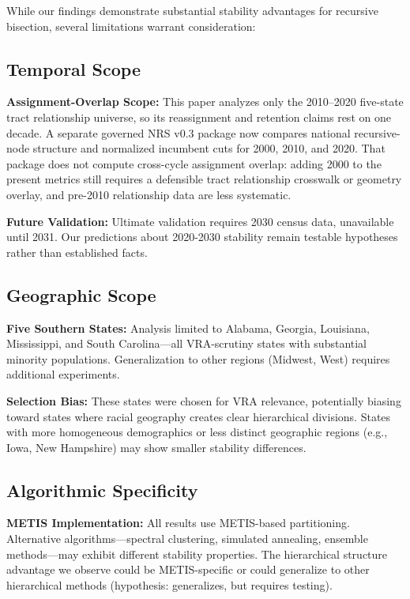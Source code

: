 While our findings demonstrate substantial stability advantages for recursive bisection, several limitations warrant consideration:

\subsection{Temporal Scope}

\textbf{Assignment-Overlap Scope:} This paper analyzes only the 2010--2020
five-state tract relationship universe, so its reassignment and retention
claims rest on one decade. A separate governed NRS v0.3 package now compares
national recursive-node structure and normalized incumbent cuts for 2000,
2010, and 2020. That package does not compute cross-cycle assignment overlap:
adding 2000 to the present metrics still requires a defensible tract
relationship crosswalk or geometry overlay, and pre-2010 relationship data are
less systematic.

\textbf{Future Validation:} Ultimate validation requires 2030 census data, unavailable until 2031. Our predictions about 2020-2030 stability remain testable hypotheses rather than established facts.

\subsection{Geographic Scope}

\textbf{Five Southern States:} Analysis limited to Alabama, Georgia, Louisiana, Mississippi, and South Carolina—all VRA-scrutiny states with substantial minority populations. Generalization to other regions (Midwest, West) requires additional experiments.

\textbf{Selection Bias:} These states were chosen for VRA relevance, potentially biasing toward states where racial geography creates clear hierarchical divisions. States with more homogeneous demographics or less distinct geographic regions (e.g., Iowa, New Hampshire) may show smaller stability differences.

\subsection{Algorithmic Specificity}

\textbf{METIS Implementation:} All results use METIS-based partitioning. Alternative algorithms—spectral clustering, simulated annealing, ensemble methods—may exhibit different stability properties. The hierarchical structure advantage we observe could be METIS-specific or could generalize to other hierarchical methods (hypothesis: generalizes, but requires testing).

